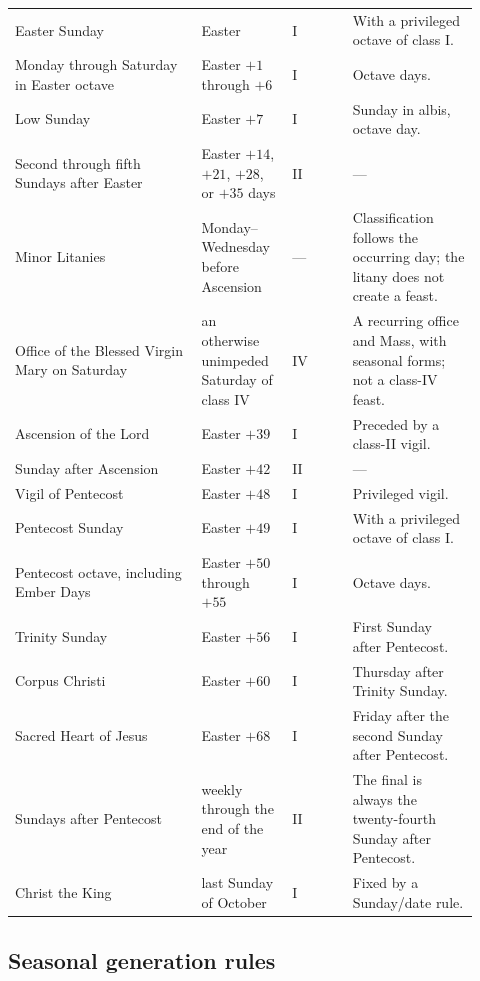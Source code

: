 \begin{longtable}{@{}>{\RaggedRight\arraybackslash}p{0.37\linewidth}>{\RaggedRight\arraybackslash}p{0.18\linewidth}>{\RaggedRight\arraybackslash}p{0.12\linewidth}>{\RaggedRight\arraybackslash}p{0.25\linewidth}@{}}
Easter Sunday & Easter & I & With a privileged octave of class I.\\
Monday through Saturday in Easter octave & Easter $+1$ through $+6$ & I & Octave days.\\
Low Sunday & Easter $+7$ & I & Sunday in albis, octave day.\\
Second through fifth Sundays after Easter & Easter $+14$, $+21$, $+28$, or $+35$ days & II & ---\\
Minor Litanies & Monday--Wednesday before Ascension & --- & Classification follows the occurring day; the litany does not create a feast.\\
Office of the Blessed Virgin Mary on Saturday & an otherwise unimpeded Saturday of class IV & IV & A recurring office and Mass, with seasonal forms; not a class-IV feast.\\
Ascension of the Lord & Easter $+39$ & I & Preceded by a class-II vigil.\\
Sunday after Ascension & Easter $+42$ & II & ---\\
Vigil of Pentecost & Easter $+48$ & I & Privileged vigil.\\
Pentecost Sunday & Easter $+49$ & I & With a privileged octave of class I.\\
Pentecost octave, including Ember Days & Easter $+50$ through $+55$ & I & Octave days.\\
Trinity Sunday & Easter $+56$ & I & First Sunday after Pentecost.\\
Corpus Christi & Easter $+60$ & I & Thursday after Trinity Sunday.\\
Sacred Heart of Jesus & Easter $+68$ & I & Friday after the second Sunday after Pentecost.\\
Sundays after Pentecost & weekly through the end of the year & II & The final is always the twenty-fourth Sunday after Pentecost.\\
Christ the King & last Sunday of October & I & Fixed by a Sunday/date rule.\\
\end{longtable}

\subsection{Seasonal generation rules}

